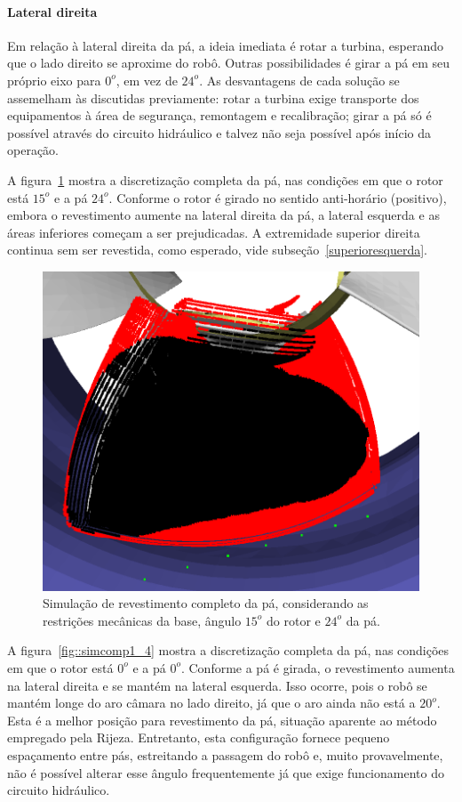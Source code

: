 \paragraph{Lateral direita}
Em relação à lateral direita da pá, a ideia imediata é rotar a turbina,
esperando que o lado direito se aproxime do robô. Outras possibilidades é
girar a pá em seu próprio eixo para $0^o$, em vez de $24^o$. As desvantagens de
cada solução se assemelham às discutidas previamente: rotar a turbina exige
transporte dos equipamentos à área de segurança, remontagem e recalibração;
girar a pá só é possível através do circuito hidráulico e talvez não seja
possível após início da operação.

A figura~\ref{fig::simcomp1_2} mostra a discretização completa da pá, nas
condições em que o rotor está $15^o$ e a pá $24^o$. Conforme o rotor é
girado no sentido anti-horário (positivo), embora o revestimento aumente na
lateral direita da pá, a lateral esquerda e as áreas inferiores começam a ser
prejudicadas. A extremidade superior direita continua sem ser revestida, como
esperado, vide subseção~\ref{superioresquerda}.

\begin{figure}[!ht]
	\centering	
	\includegraphics[width=.5\columnwidth]{method/figs/simcomp1_2.png}
	\caption{Simulação de revestimento completo da pá, considerando as
	restrições mecânicas da base, ângulo $15^o$ do rotor e $24^o$ da pá.}
	\label{fig::simcomp1_2}
\end{figure}

A figura~\ref{fig::simcomp1_4} mostra a discretização completa da pá, nas
condições em que o rotor está $0^o$ e a pá $0^o$. Conforme a pá é girada, o
revestimento aumenta na lateral direita e se mantém na lateral esquerda. Isso
ocorre, pois o robô se mantém longe do aro câmara no lado direito, já que o aro
ainda não está a $20^o$. Esta é a melhor posição para revestimento da pá,
situação aparente ao método empregado pela Rijeza. Entretanto, esta configuração
fornece pequeno espaçamento entre pás, estreitando a passagem do robô e, muito
provavelmente, não é possível alterar esse ângulo frequentemente já que exige
funcionamento do circuito hidráulico.

